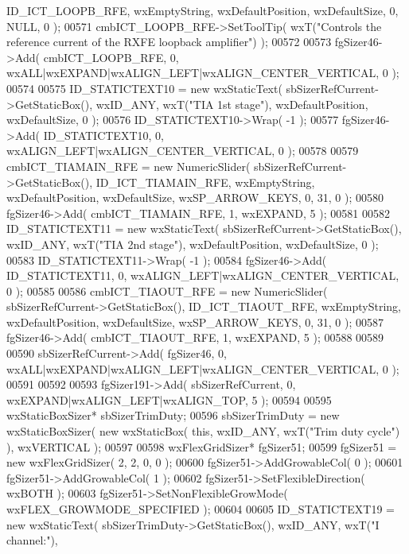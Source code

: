 \begin{DoxyCode}
      ID_ICT_LOOPB_RFE, wxEmptyString, wxDefaultPosition, wxDefaultSize, 0, NULL, 0 ); 
00571     cmbICT_LOOPB_RFE->SetToolTip( wxT(\textcolor{stringliteral}{"Controls the reference current of the RXFE loopback amplifier"}) );
00572     
00573     fgSizer46->Add( cmbICT_LOOPB_RFE, 0, wxALL|wxEXPAND|wxALIGN\_LEFT|wxALIGN\_CENTER\_VERTICAL, 0 );
00574     
00575     ID_STATICTEXT10 = \textcolor{keyword}{new} wxStaticText( sbSizerRefCurrent->GetStaticBox(), wxID\_ANY, wxT(\textcolor{stringliteral}{"TIA 1st stage"}), 
      wxDefaultPosition, wxDefaultSize, 0 );
00576     ID_STATICTEXT10->Wrap( -1 );
00577     fgSizer46->Add( ID_STATICTEXT10, 0, wxALIGN\_LEFT|wxALIGN\_CENTER\_VERTICAL, 0 );
00578     
00579     cmbICT_TIAMAIN_RFE = \textcolor{keyword}{new} NumericSlider( sbSizerRefCurrent->GetStaticBox(), 
      ID_ICT_TIAMAIN_RFE, wxEmptyString, wxDefaultPosition, wxDefaultSize, wxSP\_ARROW\_KEYS, 0, 31, 0 );
00580     fgSizer46->Add( cmbICT_TIAMAIN_RFE, 1, wxEXPAND, 5 );
00581     
00582     ID_STATICTEXT11 = \textcolor{keyword}{new} wxStaticText( sbSizerRefCurrent->GetStaticBox(), wxID\_ANY, wxT(\textcolor{stringliteral}{"TIA 2nd stage"}), 
      wxDefaultPosition, wxDefaultSize, 0 );
00583     ID_STATICTEXT11->Wrap( -1 );
00584     fgSizer46->Add( ID_STATICTEXT11, 0, wxALIGN\_LEFT|wxALIGN\_CENTER\_VERTICAL, 0 );
00585     
00586     cmbICT_TIAOUT_RFE = \textcolor{keyword}{new} NumericSlider( sbSizerRefCurrent->GetStaticBox(), 
      ID_ICT_TIAOUT_RFE, wxEmptyString, wxDefaultPosition, wxDefaultSize, wxSP\_ARROW\_KEYS, 0, 31, 0 );
00587     fgSizer46->Add( cmbICT_TIAOUT_RFE, 1, wxEXPAND, 5 );
00588     
00589     
00590     sbSizerRefCurrent->Add( fgSizer46, 0, wxALL|wxEXPAND|wxALIGN\_LEFT|wxALIGN\_CENTER\_VERTICAL, 0 );
00591     
00592     
00593     fgSizer191->Add( sbSizerRefCurrent, 0, wxEXPAND|wxALIGN\_LEFT|wxALIGN\_TOP, 5 );
00594     
00595     wxStaticBoxSizer* sbSizerTrimDuty;
00596     sbSizerTrimDuty = \textcolor{keyword}{new} wxStaticBoxSizer( \textcolor{keyword}{new} wxStaticBox( \textcolor{keyword}{this}, wxID\_ANY, wxT(\textcolor{stringliteral}{"Trim duty cycle"}) ), 
      wxVERTICAL );
00597     
00598     wxFlexGridSizer* fgSizer51;
00599     fgSizer51 = \textcolor{keyword}{new} wxFlexGridSizer( 2, 2, 0, 0 );
00600     fgSizer51->AddGrowableCol( 0 );
00601     fgSizer51->AddGrowableCol( 1 );
00602     fgSizer51->SetFlexibleDirection( wxBOTH );
00603     fgSizer51->SetNonFlexibleGrowMode( wxFLEX\_GROWMODE\_SPECIFIED );
00604     
00605     ID_STATICTEXT19 = \textcolor{keyword}{new} wxStaticText( sbSizerTrimDuty->GetStaticBox(), wxID\_ANY, wxT(\textcolor{stringliteral}{"I channel:"}), 

\end{DoxyCode}
